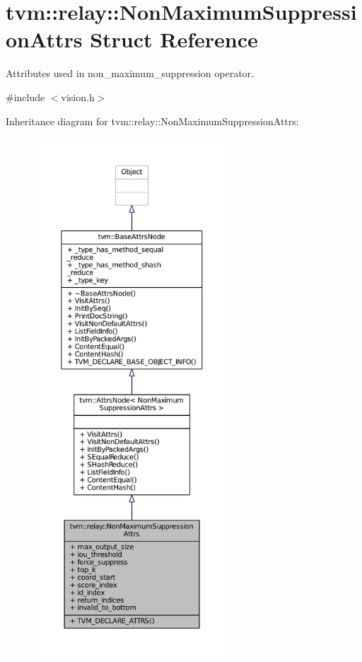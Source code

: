 \hypertarget{structtvm_1_1relay_1_1NonMaximumSuppressionAttrs}{}\section{tvm\+:\+:relay\+:\+:Non\+Maximum\+Suppression\+Attrs Struct Reference}
\label{structtvm_1_1relay_1_1NonMaximumSuppressionAttrs}


Attributes used in non\+\_\+maximum\+\_\+suppression operator.  




{\ttfamily \#include $<$vision.\+h$>$}



Inheritance diagram for tvm\+:\+:relay\+:\+:Non\+Maximum\+Suppression\+Attrs\+:
\nopagebreak
\begin{figure}[H]
\begin{center}
\leavevmode
\includegraphics[height=550pt]{structtvm_1_1relay_1_1NonMaximumSuppressionAttrs__inherit__graph}
\end{center}
\end{figure}


